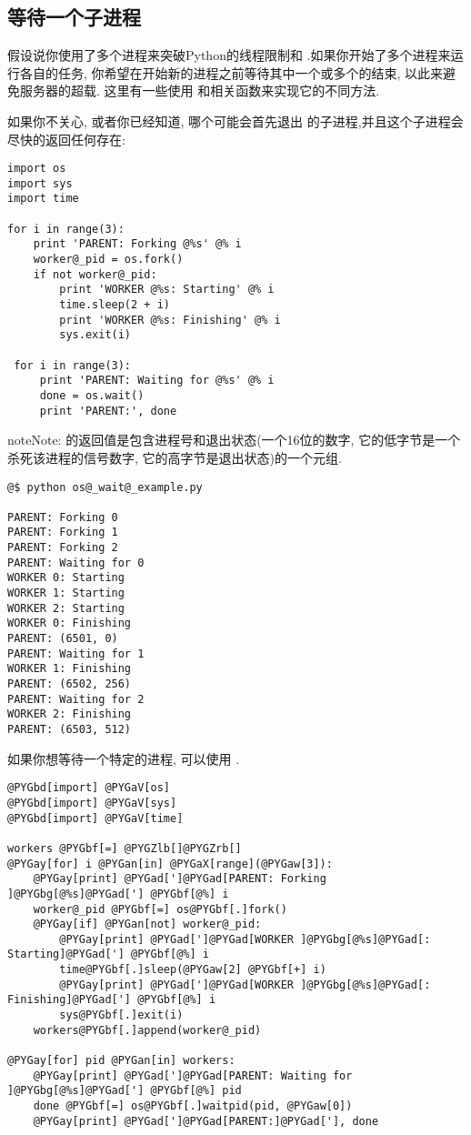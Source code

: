 \documentclass[letterpaper,10pt,english]{manual}
\begin{document}
\subsection{等待一个子进程}

假设说你使用了多个进程来突破Python的线程限制和 .如果你开始了多个进程来运行各自的任务, 你希望在开始新的进程之前等待其中一个或多个的结束, 以此来避免服务器的超载. 这里有一些使用  和相关函数来实现它的不同方法.

如果你不关心, 或者你已经知道, 哪个可能会首先退出  的子进程,并且这个子进程会尽快的返回任何存在:

\begin{Verbatim}[commandchars=@\[\]]
import os
import sys
import time

for i in range(3):
    print 'PARENT: Forking @%s' @% i
    worker@_pid = os.fork()
    if not worker@_pid:
        print 'WORKER @%s: Starting' @% i
        time.sleep(2 + i)
        print 'WORKER @%s: Finishing' @% i
        sys.exit(i)

 for i in range(3):
     print 'PARENT: Waiting for @%s' @% i
     done = os.wait()
     print 'PARENT:', done
\end{Verbatim}

\begin{notice}{note}{Note:}
 的返回值是包含进程号和退出状态(一个16位的数字, 它的低字节是一个杀死该进程的信号数字, 它的高字节是退出状态)的一个元组.
\end{notice}

\begin{Verbatim}[commandchars=@\[\]]
@$ python os@_wait@_example.py

PARENT: Forking 0
PARENT: Forking 1
PARENT: Forking 2
PARENT: Waiting for 0
WORKER 0: Starting
WORKER 1: Starting
WORKER 2: Starting
WORKER 0: Finishing
PARENT: (6501, 0)
PARENT: Waiting for 1
WORKER 1: Finishing
PARENT: (6502, 256)
PARENT: Waiting for 2
WORKER 2: Finishing
PARENT: (6503, 512)
\end{Verbatim}

如果你想等待一个特定的进程, 可以使用  .

\begin{Verbatim}[commandchars=@\[\]]
@PYGbd[import] @PYGaV[os]
@PYGbd[import] @PYGaV[sys]
@PYGbd[import] @PYGaV[time]

workers @PYGbf[=] @PYGZlb[]@PYGZrb[]
@PYGay[for] i @PYGan[in] @PYGaX[range](@PYGaw[3]):
    @PYGay[print] @PYGad[']@PYGad[PARENT: Forking ]@PYGbg[@%s]@PYGad['] @PYGbf[@%] i
    worker@_pid @PYGbf[=] os@PYGbf[.]fork()
    @PYGay[if] @PYGan[not] worker@_pid:
        @PYGay[print] @PYGad[']@PYGad[WORKER ]@PYGbg[@%s]@PYGad[: Starting]@PYGad['] @PYGbf[@%] i
        time@PYGbf[.]sleep(@PYGaw[2] @PYGbf[+] i)
        @PYGay[print] @PYGad[']@PYGad[WORKER ]@PYGbg[@%s]@PYGad[: Finishing]@PYGad['] @PYGbf[@%] i
        sys@PYGbf[.]exit(i)
    workers@PYGbf[.]append(worker@_pid)

@PYGay[for] pid @PYGan[in] workers:
    @PYGay[print] @PYGad[']@PYGad[PARENT: Waiting for ]@PYGbg[@%s]@PYGad['] @PYGbf[@%] pid
    done @PYGbf[=] os@PYGbf[.]waitpid(pid, @PYGaw[0])
    @PYGay[print] @PYGad[']@PYGad[PARENT:]@PYGad['], done
\end{Verbatim}
\end{document}
